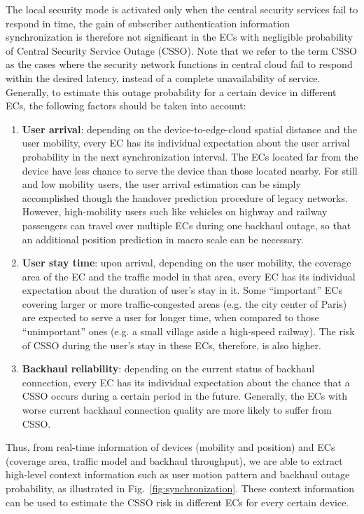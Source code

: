 \documentclass{ieeeaccess}
\newcommand{\change}[1]{#1}
\begin{document}
	The local security mode is activated only when the central security services fail to respond in time, the gain of subscriber authentication information synchronization is therefore not significant in the ECs with negligible probability of Central Security Service Outage (CSSO). \change{Note that we refer to the term CSSO as the cases where the security network functions in central cloud fail to respond within the desired latency, instead of a complete unavailability of service.} Generally, to estimate this outage probability for a certain device in different ECs, the following factors should be taken into account:
	\begin{enumerate}
		\item \textbf{User arrival}: depending on the device-to-edge-cloud spatial distance and the user mobility, every EC has its individual expectation about the user arrival probability in the next synchronization interval. The ECs located far from the device have less chance to serve the device than those located nearby. For still and low mobility users, the user arrival estimation can be simply accomplished though the handover prediction procedure of legacy networks. However, high-mobility users such like vehicles on highway and railway passengers can travel over multiple ECs during one backhaul outage, so that an additional position prediction in macro scale can be \change{necessary}.
		
		\item \textbf{User stay time}: upon arrival, depending on the user mobility, the coverage area of the EC and the traffic model in that area, every EC has its individual expectation about the duration of user's stay in it. Some ``important'' ECs covering larger or more traffic-congested areas (e.g. the city center of Paris) are expected to serve a user for longer time, when compared to those ``unimportant'' ones (e.g. a small village aside a high-speed railway). The risk of CSSO during the user's stay in these ECs, therefore, is also higher.
		
		\item \textbf{Backhaul reliability}: depending on the current status of backhaul connection, every EC has its individual expectation about the chance that a CSSO occurs during a certain period in the future. Generally, the ECs with worse current backhaul connection quality are more likely to suffer from CSSO.
	\end{enumerate}
	
	Thus, from real-time information of devices (mobility and position) and ECs (coverage area, traffic model and backhaul throughput), we are able to extract high-level context information such as user motion pattern and backhaul outage probability, as illustrated in Fig.~\ref{fig:synchronization}. These context information can be used to estimate \change{the CSSO risk in different ECs for every certain device.}
	
\end{document}
